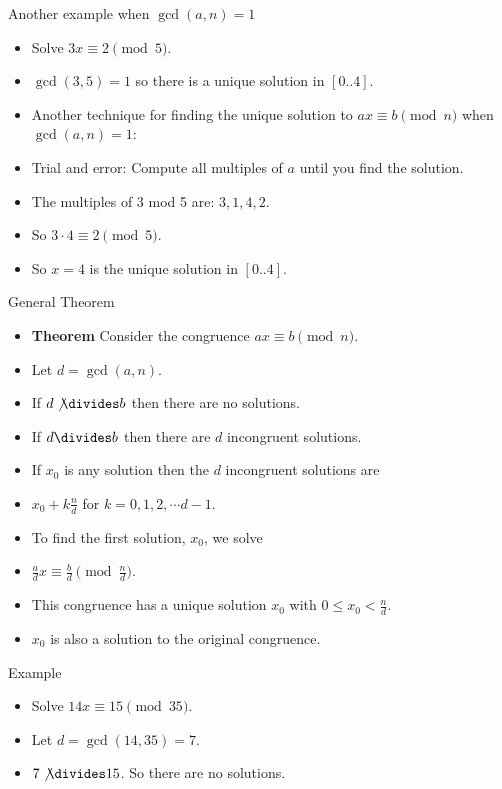 \documentclass{beamer}
\begin{document}
\begin{frame}{Another example when $\gcd(a,n)=1$}
\begin{itemize}
  \item Solve $3x \equiv 2 \pmod 5$.
  \item $\gcd(3,5)=1$ so there is a unique solution in $[0..4]$.
  \item Another technique for finding the unique solution to $ax\equiv b \pmod n$ when $\gcd(a,n)=1$:
  \item Trial and error: Compute all multiples of $a$ until you find the solution.
  \item The multiples of 3 mod 5 are: $3,1,4,2$.
  \item So $3\cdot 4 \equiv 2 \pmod 5$.
  \item So $x=4$ is the unique solution in $[0..4]$.
\end{itemize}
\end{frame}


\begin{frame}{General Theorem}
\begin{itemize}
  \item \textbf{Theorem} Consider the congruence $ax\equiv b \pmod n$.
  \item Let $d=\gcd(a,n)$.
  \item If $d\not\divides b$ then there are no solutions.
  \item If $d\divides b$ then there are $d$ incongruent solutions.
  \item If $x_0$ is any solution then the $d$ incongruent solutions are
  \item $x_0 + k\frac{n}{d}$ for $k=0,1,2,\cdots d-1$.
  \item To find the first solution, $x_0$,  we solve
  \item $\frac{a}{d}x \equiv \frac{b}{d} \pmod {\frac{n}{d}}$.
  \item This congruence has a unique solution $x_0$ with $0\leq x_0 < \frac{n}{d}$.
  \item $x_0$ is also a solution to the original congruence.
\end{itemize}
\end{frame}

\begin{frame}{Example}
\begin{itemize}
  \item Solve $14x \equiv 15 \pmod {35}$.
  \item Let $d=\gcd(14,35) = 7$.
  \item $7\not\divides 15$. So there are no solutions.
\end{itemize}
\end{frame}
\end{document}
